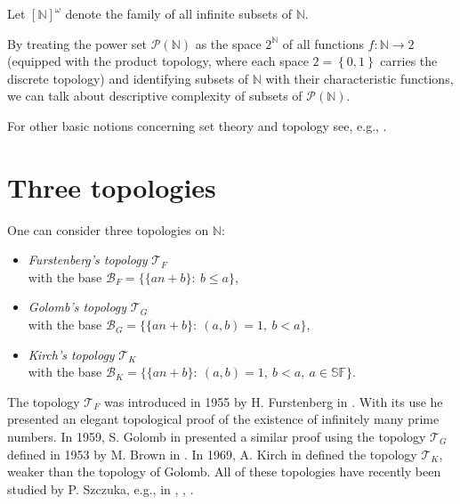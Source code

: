 \documentclass{amsart}
\theoremstyle{definition}
\theoremstyle{definition}
\newcommand{\N}{{\mathbb N}}
\newcommand{\T}{\mathcal{T}}
\newcommand{\B}{\mathcal{B}}
\newcommand{\SqrFr}{\mathbb{SF}}
\newcommand{\InfSubs}{[\N]^{\omega}}
\newcommand{\Partitions}{(\omega)^{\leq \omega}}
\begin{document}
Let $\InfSubs$ denote the family of all infinite subsets of $\N$. 


By treating the power set $\mathcal{P}(\N)$ as the space $2^\N$ of all functions $f\colon\N\to 2$ (equipped with the product topology, where each space $2= \left\{0,1\right\}$ carries the discrete topology) and identifying subsets of $\N$ with their characteristic functions, we can talk about descriptive complexity of subsets of $\mathcal{P}(\N)$.

For other basic notions concerning set theory and topology see, e.g., \cite{Kechris}.


\section*{Three topologies}

One can consider three topologies on $\N$:
\begin{itemize}
\item \emph{Furstenberg's topology} $\T_F$ \\
			with the base $\B_F = \{\{an+b\} :\ b\leq a\}$,
\item \emph{Golomb's topology} $\T_G$ \\
			with the base $\B_G = \{\{an+b\} :\ (a,b)=1,\ b<a\}$,
\item \emph{Kirch's topology} $\T_K$ \\
			with the base $\B_K = \{\{an+b\} :\ (a,b)=1,\ b<a,\ a\in\SqrFr\}$.
\end{itemize}

The topology $\T_F$ was introduced in 1955 by H. Furstenberg in \cite{F}. With its use he presented an elegant topological proof of the existence of infinitely many prime numbers. In 1959, S. Golomb in \cite{G} presented a similar proof using the topology $\T_G$ defined in 1953 by M. Brown in \cite{B}. In 1969, A. Kirch in \cite{K} defined the topology $\T_K$, weaker than the topology of Golomb. All of these topologies have recently been studied by P. Szczuka, e.g., in \cite{Szczuka1}, \cite{Szczuka2}, \cite{Szczuka3}.
\end{document}
